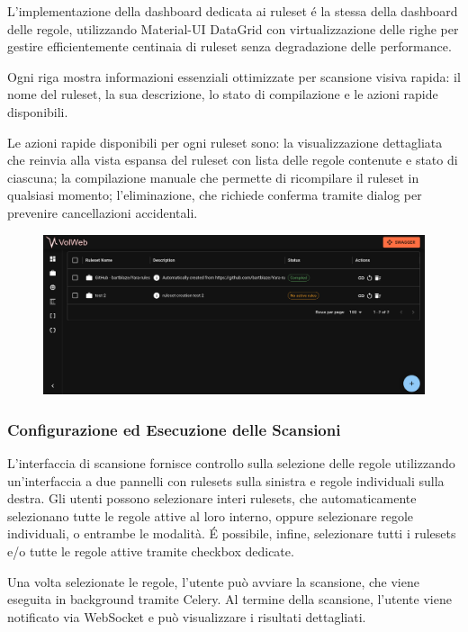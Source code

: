 L'implementazione della dashboard dedicata ai ruleset é la stessa della dashboard delle regole, utilizzando Material-UI DataGrid con virtualizzazione delle righe per gestire efficientemente centinaia di ruleset senza degradazione delle performance.

Ogni riga mostra informazioni essenziali ottimizzate per scansione visiva rapida: il nome del ruleset, la sua descrizione, lo stato di compilazione e le azioni rapide disponibili.

Le azioni rapide disponibili per ogni ruleset sono: la visualizzazione dettagliata che reinvia alla vista espansa del ruleset con lista delle regole contenute e stato di ciascuna; la compilazione manuale che permette di ricompilare il ruleset in qualsiasi momento; l'eliminazione, che richiede conferma tramite dialog per prevenire cancellazioni accidentali.

\begin{figure}[H]
\centering
\includegraphics[width=1\linewidth]{images/volweb-esteso/volweb-rulesetlist.png}
\end{figure}

\subsubsection{Configurazione ed Esecuzione delle Scansioni}

L'interfaccia di scansione fornisce controllo sulla selezione delle regole utilizzando un'interfaccia a due pannelli con rulesets sulla sinistra e regole individuali sulla destra. Gli utenti possono selezionare interi rulesets, che automaticamente selezionano tutte le regole attive al loro interno, oppure selezionare regole individuali, o entrambe le modalità. É possibile, infine, selezionare tutti i rulesets e/o tutte le regole attive tramite checkbox dedicate.

Una volta selezionate le regole, l'utente può avviare la scansione, che viene eseguita in background tramite Celery. Al termine della scansione, l'utente viene notificato via WebSocket e può visualizzare i risultati dettagliati.

